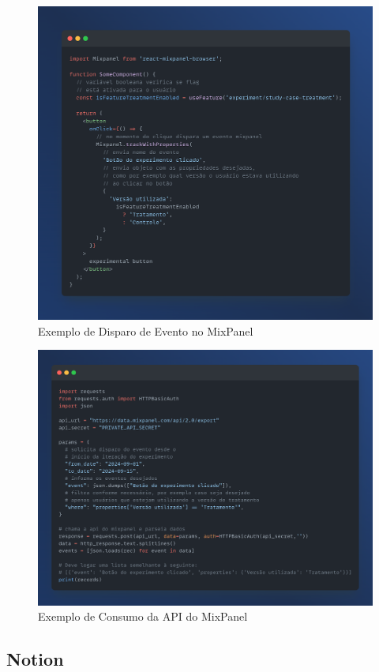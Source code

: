 \begin{figure}
    \centering
    \caption{Exemplo de Disparo de Evento no MixPanel}
    \includegraphics[width=0.75\linewidth]{figuras/exemplo_mixpanel.png}
    \begin{center}
    \end{center}
    \label{fig:exemplo-mixpanel-cliente}
\end{figure}

\begin{figure}
    \centering
    \caption{Exemplo de Consumo da API do MixPanel}
    \includegraphics[width=0.75\linewidth]{figuras/exemplo_mixpanel_consumo.png}
    \begin{center}
    \end{center}
    \label{fig:exemplo-mixpanel-consumo}
\end{figure}

\subsection{Notion}

